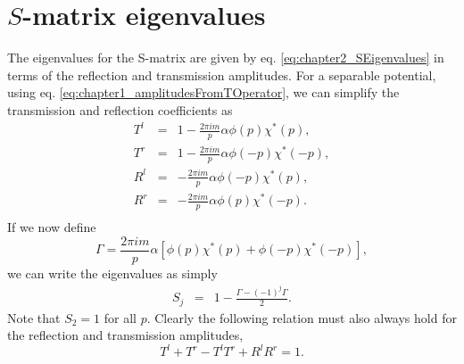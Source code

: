 \section{$S$-matrix eigenvalues}
\label{Appendix:SeparablePotentials_AmplitudesAndEigenvaluesofS}
%
The eigenvalues for the S-matrix are given by eq. \eqref{eq:chapter2_SEigenvalues} in terms of the reflection and transmission amplitudes. For a separable potential, using eq. \eqref{eq:chapter1_amplitudesFromTOperator}, we can simplify the transmission and reflection coefficients as
\begin{eqnarray}
T^{l}&=&1-\frac{2 \pi i m}{p} \alpha \phi(p) \chi^{*}(p),
\nonumber \\
T^{r}&=&1-\frac{2 \pi i m}{p} \alpha \phi(-p) \chi^{*}(-p),
\nonumber \\
R^{l}&=&-\frac{2 \pi i m}{p} \alpha \phi(-p) \chi^{*}(p),
\nonumber \\
R^{r}&=&-\frac{2 \pi i m}{p} \alpha \phi(p) \chi^{*}(-p).
\nonumber \\
\end{eqnarray}
%
If we now define
%
\begin{equation}
\Gamma=\frac{2 \pi i m}{p} \alpha \left[\phi(p) \chi^{*}(p)+\phi(-p) \chi^{*}(-p)\right],
\end{equation}
%
we can write the eigenvalues as simply
%
\begin{eqnarray}
S_{j}&=&1-\frac{\Gamma-(-1)^{j}\Gamma}{2}.
\end{eqnarray}
%
Note that $S_2=1$ for all $p$. Clearly the following relation must also always hold for the reflection and transmission amplitudes,
%
\begin{equation}
T^l + T^r - T^l T^r + R^l R^r = 1.
\end{equation}
%
%
%
